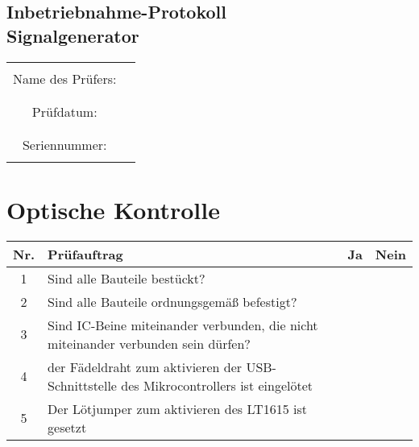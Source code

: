 \documentclass[a4paper,12pt]{article}
\begin{document}
\begin{center}
\section*{Inbetriebnahme-Protokoll \\ Signalgenerator}

	\begin{tabular}{|c|p{10cm}|}
		\hline
		& \\
		Name des Prüfers: &  \\
		& \\
		\hline
		& \\
		Prüfdatum: & \\
		& \\
		\hline
		& \\
		Seriennummer: & \\
		& \\
		\hline
	\end{tabular}
\end{center}

\section{Optische Kontrolle}

\begin{flushleft}
	\begin{tabular}{|c||p{10cm}|c|c|}
		\hline
		Nr. & Prüfauftrag & Ja & Nein \\
		\hline
		1 & Sind alle Bauteile bestückt? & & \\
		\hline
		2 & Sind alle Bauteile ordnungsgemäß befestigt? & & \\
		\hline
		3 & Sind IC-Beine miteinander verbunden, die nicht miteinander verbunden sein dürfen? & & \\
		\hline
		4 & der Fädeldraht zum aktivieren der USB-Schnittstelle des Mikrocontrollers ist eingelötet & & \\
		\hline
		5 & Der Lötjumper zum aktivieren des LT1615 ist gesetzt & & \\
		\hline
	\end{tabular}
\end{flushleft}
\end{document}

